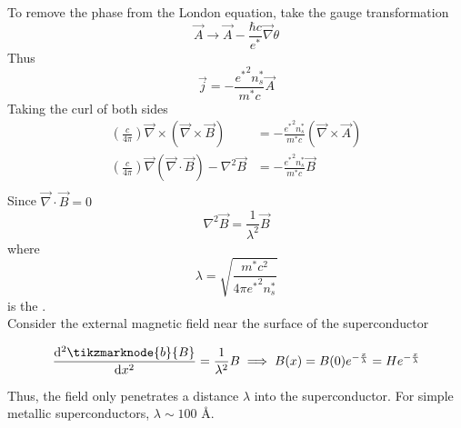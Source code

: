 \documentclass[12pt,a4paper,titlepage]{article}
\newcommand{\ul}[1]{\underline{\smash{#1}}} %
\newcommand{\angstrom}{\textup{\AA}} %
\begin{document}
To remove the phase from the London equation, take the gauge transformation
\begin{equation}
\vec{A}\rightarrow\vec{A}-\frac{\hbar c}{e^{*}}\vec{\nabla}\theta
\end{equation}
Thus
\begin{equation}
\vec{j}=-\frac{{e^{*}}^{2}n_{s}^{*}}{m^{*}c}\vec{A}
\end{equation}
Taking the curl of both sides
\begin{equation}
\begin{aligned}
\left(\frac{c}{4\pi}\right)\vec{\nabla}\times\left(\vec{\nabla}\times\vec{B}\right)&=-\frac{{e^{*}}^{2}n_{s}^{*}}{m^{*}c}\left(\vec{\nabla}\times\vec{A}\right)\\
\left(\frac{c}{4\pi}\right)\vec{\nabla}\left(\vec{\nabla}\cdot\vec{B}\right)-\nabla^{2}\vec{B}&=-\frac{{e^{*}}^{2}n_{s}^{*}}{m^{*}c}\vec{B}\\
\end{aligned}
\end{equation}
Since $\vec{\nabla}\cdot\vec{B}=0$
\begin{equation}
\nabla^{2}\vec{B}=\frac{1}{\lambda^{2}}\vec{B}
\end{equation}
where
\begin{equation}
\lambda=\sqrt{\frac{m^{*}c^{2}}{4\pi{e^{*}}^{2}n_{s}^{*}}}
\end{equation}
is the \ul{penetration depth}.\\

Consider the external magnetic field near the surface of the superconductor
\begin{center}
\end{center}

\begin{equation}
\dv[2]{\tikzmarknode{b}{B}}{x}=\frac{1}{\lambda^{2}}B\implies B(x)=B(0)e^{-\frac{x}{\lambda}}=He^{-\frac{x}{\lambda}}
\end{equation}
Thus, the field only penetrates a distance $\lambda$ into the superconductor. For simple metallic superconductors, $\lambda\sim 100$ \angstrom.
\end{document}
